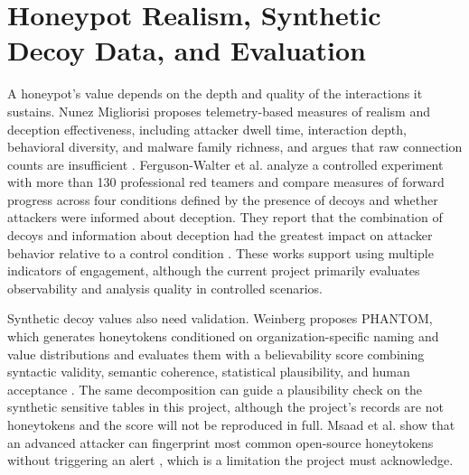 \documentclass[12pt,a4paper]{report}
\begin{document}
\section{Honeypot Realism, Synthetic Decoy Data, and Evaluation}
A honeypot's value depends on the depth and quality of the interactions it sustains. Nunez Migliorisi proposes telemetry-based measures of realism and deception effectiveness, including attacker dwell time, interaction depth, behavioral diversity, and malware family richness, and argues that raw connection counts are insufficient \cite{noelia_nunez_migliorisi_empirical_2026}. Ferguson-Walter et al. analyze a controlled experiment with more than 130 professional red teamers and compare measures of forward progress across four conditions defined by the presence of decoys and whether attackers were informed about deception. They report that the combination of decoys and information about deception had the greatest impact on attacker behavior relative to a control condition \cite{ferguson-walter_examining_nodate}. These works support using multiple indicators of engagement, although the current project primarily evaluates observability and analysis quality in controlled scenarios.

Synthetic decoy values also need validation. Weinberg proposes PHANTOM, which generates honeytokens conditioned on organization-specific naming and value distributions and evaluates them with a believability score combining syntactic validity, semantic coherence, statistical plausibility, and human acceptance \cite{weinberg_phantom_2026}. The same decomposition can guide a plausibility check on the synthetic sensitive tables in this project, although the project's records are not honeytokens and the score will not be reproduced in full. Msaad et al. show that an advanced attacker can fingerprint most common open-source honeytokens without triggering an alert \cite{reiser_honeysweeper_2022}, which is a limitation the project must acknowledge.
\end{document}
